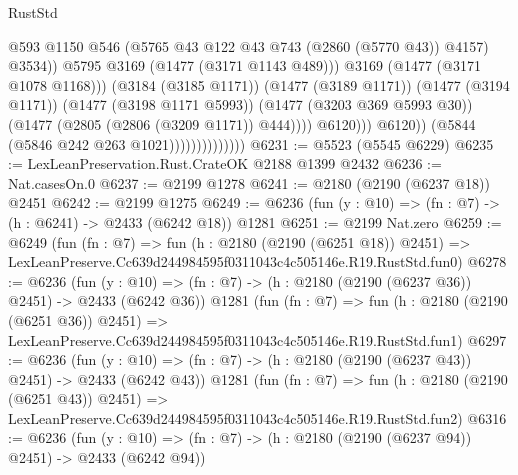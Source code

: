 \begin{lexlean}{RustStd}
\begin{coremodule}
                                                  @593
                                                  @1150
                                                  @546
                                                  (@5765
                                                    @43
                                                    @122
                                                    @43
                                                    @743
                                                    (@2860 (@5770 @43))
                                                    @4157)
                                                  @3534))
                                              @5795
                                              @3169
                                              (@1477 (@3171 @1143 @489)))
                                            @3169
                                            (@1477 (@3171 @1078 @1168)))
                                          (@3184 (@3185 @1171))
                                          (@1477 (@3189 @1171))
                                          (@1477 (@3194 @1171))
                                          (@1477 (@3198 @1171 @5993))
                                          (@1477 (@3203 @369 @5993 @30))
                                          (@1477 (@2805 (@2806 (@3209 @1171)) @444))))
                                      @6120)))
                                @6120))
                            (@5844 (@5846 @242 @263 @1021))))))))))))))
@6231 := @5523 (@5545 @6229)
@6235 := LexLeanPreservation.Rust.CrateOK @2188 @1399 @2432
@6236 := Nat.casesOn.{0}
@6237 := @2199 @1278
@6241 := @2180 (@2190 (@6237 @18)) @2451
@6242 := @2199 @1275
@6249 := @6236 (fun (y : @10) => (fn : @7) -> (h : @6241) -> @2433 (@6242 @18)) @1281
@6251 := @2199 Nat.zero
@6259 := @6249
    (fun (fn : @7) =>
    fun (h : @2180 (@2190 (@6251 @18)) @2451) =>
    LexLeanPreserve.Cc639d244984595f0311043c4c505146e.R19.RustStd.fun0)
@6278 := @6236
    (fun (y : @10) => (fn : @7) -> (h : @2180 (@2190 (@6237 @36)) @2451) -> @2433 (@6242 @36))
    @1281
    (fun (fn : @7) =>
    fun (h : @2180 (@2190 (@6251 @36)) @2451) =>
    LexLeanPreserve.Cc639d244984595f0311043c4c505146e.R19.RustStd.fun1)
@6297 := @6236
    (fun (y : @10) => (fn : @7) -> (h : @2180 (@2190 (@6237 @43)) @2451) -> @2433 (@6242 @43))
    @1281
    (fun (fn : @7) =>
    fun (h : @2180 (@2190 (@6251 @43)) @2451) =>
    LexLeanPreserve.Cc639d244984595f0311043c4c505146e.R19.RustStd.fun2)
@6316 := @6236
    (fun (y : @10) => (fn : @7) -> (h : @2180 (@2190 (@6237 @94)) @2451) -> @2433 (@6242 @94))

\end{coremodule}
\end{lexlean}
